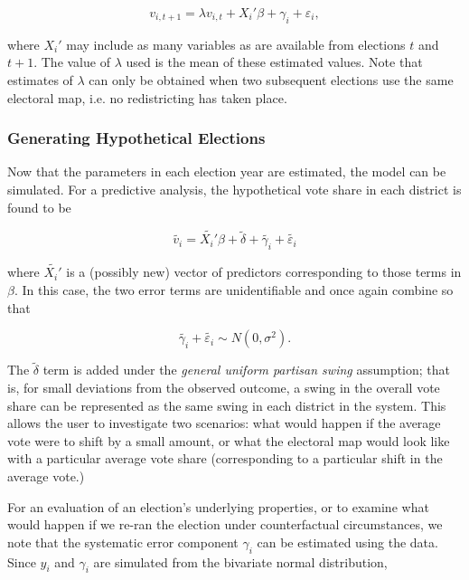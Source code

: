 \documentclass[oneside,letterpaper,titlepage]{article}
\begin{document}
\[ v_{i,t+1} = \lambda v_{i,t} + X_i'\beta + \gamma_i + \varepsilon_i, \]

\noindent where $X_i'$ may include as many variables as are available from elections $t$ and $t+1$. The value of $\lambda$ used is the mean of these estimated values. Note that estimates of $\lambda$ can only be obtained when two subsequent elections use the same electoral map, i.e. no redistricting has taken place.


\subsubsection*{Generating Hypothetical Elections}

Now that the parameters in each election year are estimated, the model can be simulated. For a predictive analysis, the hypothetical vote share in each district is found to be

\[ \tilde{v_i} = \tilde{X_i'}\beta + \tilde{\delta} + \tilde{\gamma_i} + \tilde{\varepsilon_i} \]

\noindent where $\tilde{X_i'}$ is a (possibly new) vector of predictors corresponding to those terms in $\beta$. In this case, the two error terms are unidentifiable and once again combine so that 

\[ \tilde{\gamma_i} + \tilde{\varepsilon_i} \sim N(0,\sigma^2). \]

The $\tilde{\delta}$ term is added under the \textit{general uniform partisan swing} assumption; that is, for small deviations from the observed outcome, a swing in the overall vote share can be represented as the same swing in each district in the system. This allows the user to investigate two scenarios: what would happen if the average vote were to shift by a small amount, or what the electoral map would look like with a particular average vote share (corresponding to a particular shift in the average vote.)

For an evaluation of an election's underlying properties, or to examine what would happen if we re-ran the election under counterfactual circumstances, we note that the systematic error component $\gamma_i$ can be estimated using the data. Since $y_i$ and $\gamma_i$ are simulated from the bivariate normal distribution,
\end{document}

